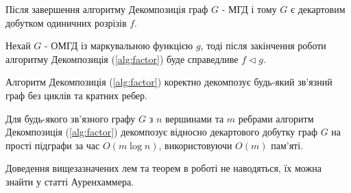 \begin{lemma}
  Після завершення алгоритму Декомпозиція граф $G$ - МГД і тому $G$ є декартовим добутком одиничних розрізів $f$.
\end{lemma}

\begin{lemma}
  Нехай $G$ - ОМГД із маркувальною функцією $g$, тоді  після закінчення роботи алгоритму Декомпозиція (\ref{alg:factor}) буде справедливе $f \triangleleft g$.
\end{lemma}

\begin{theorem}
  Алгоритм Декомпозиція (\ref{alg:factor}) коректно декомпозує будь-який зв'язний граф без циклів та кратних ребер.
\end{theorem}

\begin{theorem}
  Для будь-якого зв'язного графу $G$ з $n$ вершинами та $m$ ребрами алгоритм Декомпозиція (\ref{alg:factor}) декомпозує відносно декартового добутку граф $G$ на прості підграфи за час $O(m \log n)$, використовуючи $O(m)$ пам'яті.
\end{theorem}

Доведення вищезазначених лем та теорем в роботі не наводяться, їх можна знайти у статті Ауренхаммера\cite{aurenhammer1992cgflce}.
